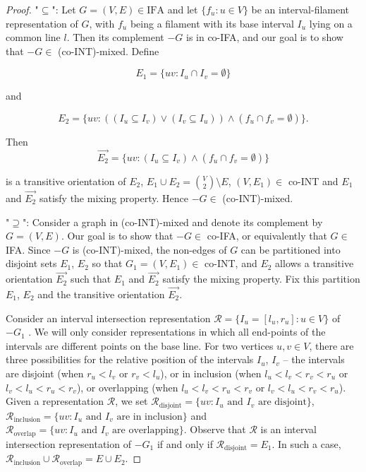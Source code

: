 \begin{proof}
	"$\subseteq$": Let $G = (V, E) \in \text{IFA}$ and let $\{f_u : u \in V\}$ be an interval-filament representation of $G$, with $f_u$ being a filament with its base interval $I_u$ lying on a common line $l$. Then its complement $-G$ is in co-IFA, and our goal is to show that $-G \in$ (co-INT)-mixed. Define
	
	$$
	E_1 = \{uv : I_u \cap I_v = \emptyset\}
	$$
	
	and
	
	$$
	E_2 = \{uv : ((I_u \subseteq I_v ) \lor (I_v \subseteq I_u )) \land (f_u \cap f_v = \emptyset)\}.
	$$
	
	Then
	$$
	\overrightarrow{E_2} = \{uv : (I_u \subseteq I_v ) \land (f_u \cap f_v = \emptyset)\}
	$$
	
	is a transitive orientation of $E_2$, $E_1 \cup E_2 = \binom{V}{2} \setminus E$, $(V, E_1) \in$ co-INT and $E_1$ and $\overrightarrow{E_2}$ satisfy the mixing property. Hence $-G \in$ (co-INT)-mixed.
	
	"$\supseteq$": Consider a graph in (co-INT)-mixed and denote its complement by $G = (V, E)$. Our goal is to show that $-G \in$ co-IFA, or equivalently that $G \in$ IFA. Since $-G$ is (co-INT)-mixed, the non-edges of $G$ can be partitioned into disjoint sets $E_1$, $E_2$ so that $G_1 = (V, E_1) \in$ co-INT, and $E_2$ allows a transitive orientation $\overrightarrow{E_2}$ such that $E_1$ and $\overrightarrow{E_2}$ satisfy the mixing property. Fix this partition $E_1$, $E_2$ and the transitive orientation $\overrightarrow{E_2}$.
	
	Consider an interval intersection representation $\mathcal{R} = \{I_u = [l_u , r_u] : u \in V\}$ of $-G_1$ . We will only consider representations in which all end-points of the intervals are different points on the base line. For two vertices $u, v \in V$, there are three possibilities for the relative position of the intervals $I_u$, $I_v$ -- the intervals are disjoint (when $r_u < l_v$ or $r_v < l_u$), or in inclusion (when $l_u < l_v < r_v < r_u$ or $l_v <
	l_u < r_u < r_v$), or overlapping (when $l_u < l_v < r_u < r_v$ or $l_v < l_u < r_v < r_u$). Given a representation	$\mathcal{R}$, we set $\mathcal{R}_{\text{disjoint}} = \{uv : I_u \text{ and } I_v \text{ are disjoint}\}$, $\mathcal{R}_{\text{inclusion}} = \{uv : I_u \text{ and } I_v \text{ are in inclusion}\}$ and $\mathcal{R}_{\text{overlap}} = \{uv : I_u \text{ and } I_v \text{ are overlapping}\}$. Observe that $\mathcal{R}$ is an interval intersection representation of $-G_1$ if and only if $\mathcal{R}_{\text{disjoint}} = E_1$. In such a case, $\mathcal{R}_{\text{inclusion}} \cup \mathcal{R}_{\text{overlap}} = E \cup E_2$.
	

\end{proof}

